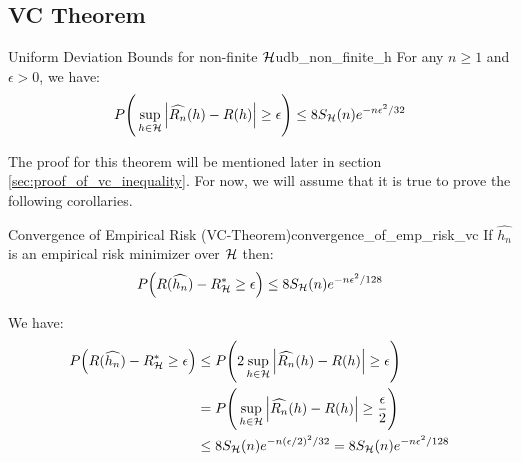 \subsection{VC Theorem}
\begin{theorem}{Uniform Deviation Bounds for non-finite $\mathcal{H}$}{udb_non_finite_h}
    For any $n\ge1$ and $\epsilon>0$, we have:
    \begin{align*}
        P\Bigg( 
            \sup_{h\in\mathcal{H}} \Big| 
                \widehat{R_n}(h) - R(h)
             \Big| \ge \epsilon
         \Bigg) \le 8S_{\mathcal{H}}(n) e^{-n\epsilon^2/32}
    \end{align*}
\end{theorem}

\begin{proof*}
    The proof for this theorem will be mentioned later in section \ref{sec:proof_of_vc_inequality}. For now, we will assume that it is true to prove the following corollaries.
\end{proof*}

\begin{corollary}{Convergence of Empirical Risk (VC-Theorem)}{convergence_of_emp_risk_vc}
    If $\widehat{h_n}$ is an empirical risk minimizer over $\mathcal{H}$ then:
    \begin{align*}
        P\Big( 
            R(\widehat{h_n}) - R_{\mathcal{H}}^* \ge \epsilon
         \Big) \le 8S_{\mathcal{H}}(n)e^{-n\epsilon^2/128}
    \end{align*}
\end{corollary}

\begin{proof*}
    We have:
    \begin{align*}
        P\Big( 
            R(\widehat{h_n}) - R_{\mathcal{H}}^* \ge \epsilon
         \Big) 
        &\le 
        P\Bigg( 
            2\sup_{h\in\mathcal{H}} \Big| \widehat{R_n}(h) - R(h) \Big| \ge \epsilon
         \Bigg) \\
        &= 
        P\Bigg( 
            \sup_{h\in\mathcal{H}} \Big| \widehat{R_n}(h) - R(h) \Big| \ge \frac{\epsilon}{2}
         \Bigg) \\
        &\le 8S_{\mathcal{H}}(n)e^{-n(\epsilon/2)^2/32} = 8S_{\mathcal{H}}(n)e^{-n\epsilon^2/128}
    \end{align*}
\end{proof*}


